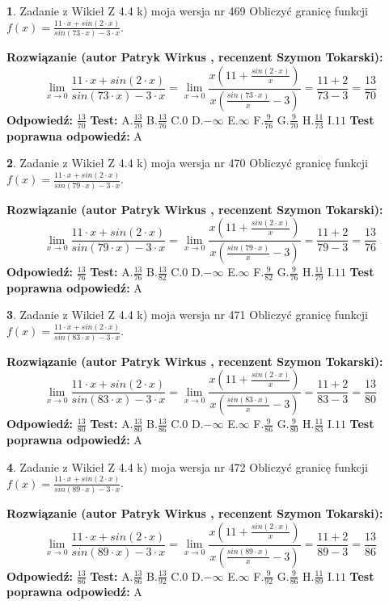 \documentclass[12pt, a4paper]{article}
\theoremstyle{definition} %
\newtheorem{zad}{}
\newcommand{\zadStart}[1]{\begin{zad}#1\newline}
\newcommand{\zadStop}{\end{zad}}
\newcommand{\rozwStart}[2]{\noindent \textbf{Rozwiązanie (autor #1 , recenzent #2): }\newline}
\newcommand{\rozwStop}{\newline}
\newcommand{\odpStart}{\noindent \textbf{Odpowiedź:}\newline}
\newcommand{\odpStop}{\newline}
\newcommand{\testStart}{\noindent \textbf{Test:}\newline}
\newcommand{\testStop}{\newline}
\newcommand{\kluczStart}{\noindent \textbf{Test poprawna odpowiedź:}\newline}
\newcommand{\kluczStop}{\newline}
\begin{document}
\zadStart{Zadanie z Wikieł Z 4.4 k) moja wersja nr 469}
Obliczyć granicę funkcji $f(x)=\frac{11\cdot x +sin(2\cdot x)}{sin(73\cdot x) -3\cdot x}$.
\zadStop
\rozwStart{Patryk Wirkus}{Szymon Tokarski}
$$\lim\limits_{x\to 0}\frac{11\cdot x +sin(2\cdot x)}{sin(73\cdot x) -3\cdot x}
=\lim\limits_{x\to 0}\frac{x(11+\frac{sin(2\cdot x)}{x})}{x(\frac{sin(73\cdot x)}{x}-3)}
=\frac{11+2}{73-3} = \frac{13}{70}$$
\rozwStop
\odpStart
$\frac{13}{70}$
\odpStop
\testStart
A.$\frac{13}{70}$
B.$\frac{13}{76}$
C.$0$
D.$-\infty$
E.$\infty$
F.$\frac{9}{76}$
G.$\frac{9}{70}$
H.$\frac{11}{73}$
I.$11$
\testStop
\kluczStart
A
\kluczStop



\zadStart{Zadanie z Wikieł Z 4.4 k) moja wersja nr 470}
Obliczyć granicę funkcji $f(x)=\frac{11\cdot x +sin(2\cdot x)}{sin(79\cdot x) -3\cdot x}$.
\zadStop
\rozwStart{Patryk Wirkus}{Szymon Tokarski}
$$\lim\limits_{x\to 0}\frac{11\cdot x +sin(2\cdot x)}{sin(79\cdot x) -3\cdot x}
=\lim\limits_{x\to 0}\frac{x(11+\frac{sin(2\cdot x)}{x})}{x(\frac{sin(79\cdot x)}{x}-3)}
=\frac{11+2}{79-3} = \frac{13}{76}$$
\rozwStop
\odpStart
$\frac{13}{76}$
\odpStop
\testStart
A.$\frac{13}{76}$
B.$\frac{13}{82}$
C.$0$
D.$-\infty$
E.$\infty$
F.$\frac{9}{82}$
G.$\frac{9}{76}$
H.$\frac{11}{79}$
I.$11$
\testStop
\kluczStart
A
\kluczStop



\zadStart{Zadanie z Wikieł Z 4.4 k) moja wersja nr 471}
Obliczyć granicę funkcji $f(x)=\frac{11\cdot x +sin(2\cdot x)}{sin(83\cdot x) -3\cdot x}$.
\zadStop
\rozwStart{Patryk Wirkus}{Szymon Tokarski}
$$\lim\limits_{x\to 0}\frac{11\cdot x +sin(2\cdot x)}{sin(83\cdot x) -3\cdot x}
=\lim\limits_{x\to 0}\frac{x(11+\frac{sin(2\cdot x)}{x})}{x(\frac{sin(83\cdot x)}{x}-3)}
=\frac{11+2}{83-3} = \frac{13}{80}$$
\rozwStop
\odpStart
$\frac{13}{80}$
\odpStop
\testStart
A.$\frac{13}{80}$
B.$\frac{13}{86}$
C.$0$
D.$-\infty$
E.$\infty$
F.$\frac{9}{86}$
G.$\frac{9}{80}$
H.$\frac{11}{83}$
I.$11$
\testStop
\kluczStart
A
\kluczStop



\zadStart{Zadanie z Wikieł Z 4.4 k) moja wersja nr 472}
Obliczyć granicę funkcji $f(x)=\frac{11\cdot x +sin(2\cdot x)}{sin(89\cdot x) -3\cdot x}$.
\zadStop
\rozwStart{Patryk Wirkus}{Szymon Tokarski}
$$\lim\limits_{x\to 0}\frac{11\cdot x +sin(2\cdot x)}{sin(89\cdot x) -3\cdot x}
=\lim\limits_{x\to 0}\frac{x(11+\frac{sin(2\cdot x)}{x})}{x(\frac{sin(89\cdot x)}{x}-3)}
=\frac{11+2}{89-3} = \frac{13}{86}$$
\rozwStop
\odpStart
$\frac{13}{86}$
\odpStop
\testStart
A.$\frac{13}{86}$
B.$\frac{13}{92}$
C.$0$
D.$-\infty$
E.$\infty$
F.$\frac{9}{92}$
G.$\frac{9}{86}$
H.$\frac{11}{89}$
I.$11$
\testStop
\kluczStart
A
\kluczStop
\end{document}
